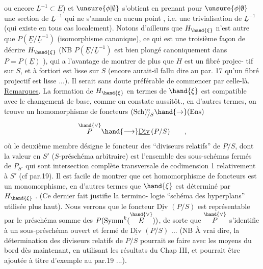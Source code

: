 
ou encore $\underline{L}^{-1}\subset\underline{E}$) et $\unsure{\phi|\emptyset}$ s'obtient en prenant pour $\unsure{\phi|\emptyset}$ une section de $\underline{L}^{-1}$ qui
ne s'annule en aucun point , i.e. une trivialisation de $\underline{L}^{-1}$
(qui existe en tous cas localement). Notons d'ailleurs que $H_{\hand{\xi}}$ n'est
autre que $P(\underline{E}/\underline{L}^{-1})$ (isomorphisme canonique), ce qui est une troisième
façon de décrire $H_{\hand{\xi}}$ (NB $P(\underline{E}/\underline{L}^{-1})$ est bien plongé canoniquement dans
$P = P(\underline{E})$ ), qui a l'avantage de montrer de plus que $H$ est un fibré projec-%
tif sur $S$, et à fortiori est lisse sur $S$ (encore aurait-il fallu dire 
\placedmargin{$\|$} au par. 17 qu'un fibré projectif est lisse ...). Il serait sans doute
\placedmargin{$\|$} préférable de commencer par celle-là.
\uline{Remarques}. La formation de $H_{\hand{\xi}}$ en termes de $\hand{\xi}$ est compatible avec
le changement de base, comme on constate aussitôt., en d'autres termes,
on trouve un homomorphisme de foncteurs $(\mathrm{Sch})^{\circ}_{/S}\hand{\to}(\mathrm{Ens})$
\[ \overset{\hand{\vee}}{P} \hand{\longrightarrow} \underline{\mathrm{Div}}\,(P/S) \qquad , \]
où le deuxième membre désigne le foncteur des ``diviseurs relatifs'' de $P/S$,
dont la valeur en $S'$ ($S$-préschéma arbitraire) est l'ensemble des
sous-schémas fermés de $P_{S'}$ qui sont intersection complète transversale
de codimension 1 relativement à $S'$ (cf par.19). Il est facile de montrer
que cet homomorphisme de foncteurs est un monomorphisme, en d'autres
termes que $\hand{\xi}$ est déterminé par $H_{\hand{\xi}}$ . (Ce dernier fait justifie la termino-%
logie ``schéma des hyperplans'' utilisée plus haut). Nous verrons  \placedmargin{)}
 que le foncteur $\underline{\mathrm{Div}}$ $(P/S)$ est représentable par le préschéma somme
des $P(\mathrm{Symm}^{k}(\overset{\hand{\vee}}{E}))$, de sorte que $\overset{\hand{\vee}}{P}$ s'identifie à un sous-préschéma ouvert
et fermé de $\underline{\mathrm{Div}}$ $(P/S)$ ... (NB À vrai dire, la détermination des diviseurs
\placedmargin{$|$} relatifs de $P/S$ pourrait se faire avec les moyens du bord dès maintenant, en
\placedmargin{$|$} utilisant les résultats du Chap III, et pourrait être ajoutée  à titre
\placedmargin{$|$} d'exemple au par.19 ...).

